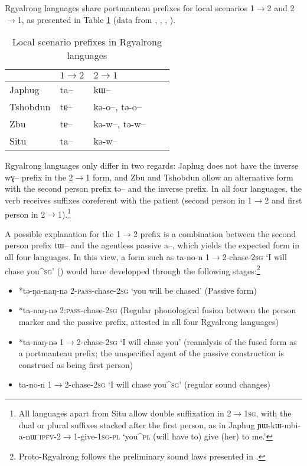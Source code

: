 \documentclass[oldfontcommands,oneside,a4paper,11pt]{article}
\newcommand{\ipa}[1]{{\phon \mbox{#1}}} %
\begin{document}
Rgyalrong languages share portmanteau prefixes for local scenarios 1$\rightarrow$2 and 2$\rightarrow$1, as presented in Table \ref{tab:local.rgy} (data from \citealt[218]{linxr93jiarong}, \citealt{jackson02rentongdengdi}, \citealt{jacques12agreement}, \citealt{gongxun14agreement}).

\begin{table}
\caption{Local scenario prefixes in Rgyalrong languages} \centering \label{tab:local.rgy} 
\begin{tabular}{lllll}
\toprule
& $1\rightarrow2$ & $2\rightarrow1$ \\
\midrule
Japhug &  \ipa{ta--} & \ipa{kɯ--} \\
Tshobdun &  \ipa{tɐ--} & \ipa{kə-o--}, \ipa{tə-o--} \\
Zbu &  \ipa{tɐ--} &\ipa{kə-w--}, \ipa{tə-w--} \\
Situ &  \ipa{ta--} & \ipa{kə-w--} \\
\bottomrule
\end{tabular}
\end{table}

Rgyalrong languages only differ in two regards: Japhug does not have the inverse \ipa{wɣ--} prefix in the  2$\rightarrow$1 form, and Zbu and Tshobdun allow an alternative form with the second person prefix \ipa{tə--} and the inverse prefix. In all four languages, the verb receives suffixes coreferent with the patient (second person in 1$\rightarrow$2 and first person in  2$\rightarrow$1).\footnote{All languages apart from Situ allow double suffixation in 2$\rightarrow$\textsc{1sg}, with the dual or plural suffixes stacked after the first person, as in Japhug \ipa{ɲɯ-kɯ-mbi-a-nɯ} \textsc{ipfv}-2$\rightarrow$1-give-\textsc{1sg-pl} `you^{\textsc{pl}} (will have to) give (her) to me.'}

A possible explanation for the 1$\rightarrow$2  prefix is a combination between the second person prefix \ipa{tɯ--} and the agentless passive \ipa{a--}, which yields the expected form in all four languages. In this view, a form such as \ipa{ta-no-n} 1$\rightarrow$2-chase-\textsc{2sg} `I will chase you^{\textsc{sg}}' (\citealt[219]{linxr93jiarong}) would have developped through the following stages:\footnote{Proto-Rgyalrong follows the preliminary sound laws presented in \citet{jacques04these}.}

\begin{itemize}
\item *\ipa{tə-ŋa-naŋ-nə}  2-\textsc{pass}-chase-\textsc{2sg} `you will be chased' (Passive form)
\item *\ipa{ta-naŋ-nə}  2:\textsc{pass}-chase-\textsc{2sg} (Regular phonological fusion between the person marker and the passive prefix, attested in all four Rgyalrong languages)  
\item  *\ipa{ta-naŋ-nə}  1$\rightarrow$2-chase-\textsc{2sg} `I will chase you' (reanalysis of the fused form as a portmanteau prefix; the unspecified agent of the passive construction is construed as being first person)
\item  \ipa{ta-no-n} 1$\rightarrow$2-chase-\textsc{2sg} `I will chase you^{\textsc{sg}}' (regular sound changes)
\end{itemize}
\end{document}
